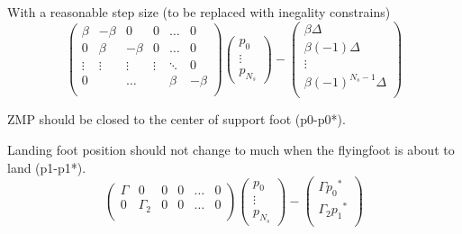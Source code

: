 \documentclass[10pt,a4paper]{article}
\begin{document}
    With a reasonable step size
    (to be replaced with inegality constrains)
    \begin{equation}\label{min_step_dist}
        \begin{pmatrix} 
             \beta    & -\beta 	 	& 0 &0& \hdots & 0 \\
             0&\beta    & -\beta 	 	& 0 & \hdots & 0 \\
             \vdots	 			&\vdots 	& \vdots & \vdots &  \ddots & 0 \\ 
             0       		&  	 		&    \hdots&  & \beta    & -\beta \\
        \end{pmatrix}
        \begin{pmatrix} 
            p_0 \\
            \vdots \\
            p_{N_s}
        \end{pmatrix}- \begin{pmatrix} 
            \beta \Delta\\
            \beta (-1)\Delta\\
            \vdots \\
            \beta(-1)^{N_s-1}\Delta\\
        \end{pmatrix}
    \end{equation}




    ZMP should be closed to the center of support foot (p0-p0*).

    Landing foot position should not change to much when the flyingfoot is about to land (p1-p1*).
    \begin{equation}\label{p0_p1}
        \begin{pmatrix} 
             \Gamma    & 0 	 	& 0 &0& \hdots & 0 \\
             0&\Gamma_2    & 0	 	& 0 & \hdots & 0 \\
            \end{pmatrix}
        \begin{pmatrix} 
            p_0 \\
            \vdots \\
            p_{N_s}
        \end{pmatrix}- \begin{pmatrix} 
            \Gamma     {p_{0}}^*\\
             \Gamma_2  {p_{1}}^*\\
        \end{pmatrix}
    \end{equation}
\end{document}

